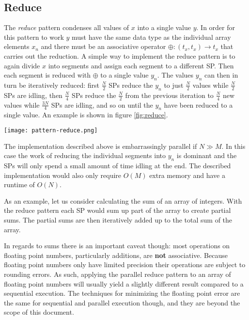 \subsection{Reduce}
\label{reduce}
The \textit{reduce} pattern condenses all values of $x$ into a single value $y$.
In order for this pattern to work $y$ must have the same data type as the individual array elements $x_n$ and
there must be an associative operator $\oplus: (t_x, t_x) \rightarrow t_x$ that carries out the reduction.
A simple way to implement the reduce pattern is to again divide $x$ into segments and assign each segment to a different SP.
Then each segment is reduced with $\oplus$ to a single value $y_n$.
The values $y_n$ can then in turn be iteratively reduced:
first $\frac{N}{2}$ SPs reduce the $y_n$ to just $\frac{N}{2}$ values while $\frac{N}{2}$ SPs are idling,
then $\frac{N}{4}$ SPs reduce the $\frac{N}{2}$ from the previous iteration to $\frac{N}{4}$ new values while $\frac{3N}{4}$ SPs are idling,
and so on until the $y_n$ have been reduced to a single value.
An example is shown in figure \ref{fig:reduce}.
\begin{figure*}
	\centering
	\texttt{[image: pattern-reduce.png]}
	\caption{
		Visualization of the reduce pattern.
		Integers are summed up to a single value.
		In this example four streaming processors/CPU cores are used.
	}
	\label{fig:reduce}
\end{figure*}

The implementation described above is embarrassingly parallel if $N \gg M$.
In this case the work of reducing the individual segments into $y_n$ is dominant
and the SPs will only spend a small amount of time idling at the end.
The described implementation would also only require $O(M)$ extra memory and have a runtime of $O(N)$.

As an example, let us consider calculating the sum of an array of integers.
With the reduce pattern each SP would sum up part of the array to create partial sums.
The partial sums are then iteratively added up to the total sum of the array.

In regards to sums there is an important caveat though:
most operations on floating point numbers, particularly additions, are \textbf{not} associative.
Because floating point numbers only have limited precision their operations are subject to rounding errors.
As such, applying the parallel reduce pattern to an array of floating point numbers will usually yield a slightly different result
compared to a sequential execution.
The techniques for minimizing the floating point error are the same for sequential and parallel execution though,
and they are beyond the scope of this document.
